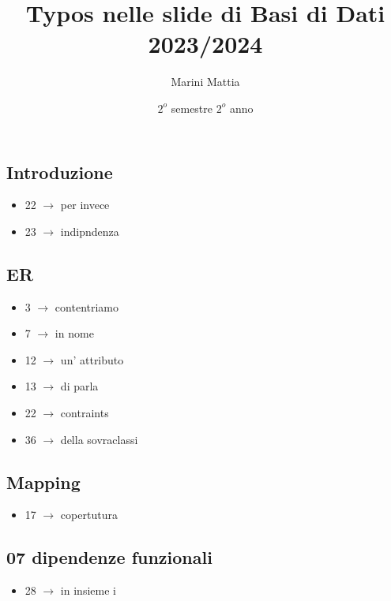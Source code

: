 \endofdump

\usetikzlibrary{external}
\tikzexternalize[prefix=tikz/]

\title{Typos nelle slide di Basi di Dati 2023/2024}
\author{Marini Mattia}
\date{$ 2^o $ semestre $ 2^o $ anno}


\maketitle
\tableofcontents

\subsection{Introduzione}
\begin{itemize}
  \item 22 $ \rightarrow  $ per invece
  \item 23 $ \rightarrow  $ indipndenza
\end{itemize}

\subsection{ER}
\begin{itemize}
  \item 3 $ \rightarrow  $ contentriamo
  \item 7 $ \rightarrow  $ in nome
  \item 12 $ \rightarrow  $ un' attributo
  \item 13 $ \rightarrow  $ di parla
  \item 22 $ \rightarrow  $ contraints
  \item 36 $ \rightarrow  $ della sovraclassi
\end{itemize}

\subsection{Mapping}
\begin{itemize}
  \item 17 $ \rightarrow  $ copertutura
\end{itemize}

\subsection{07 dipendenze funzionali}
\begin{itemize}
  \item 28 $ \rightarrow  $ in insieme
  i
\end{itemize}

